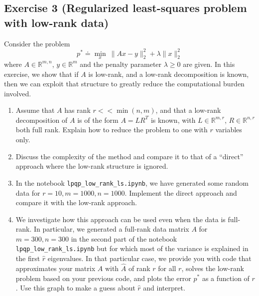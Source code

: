 \documentclass[11pt]{article}
\begin{document}
\newpage
\subsection*{Exercise 3 (Regularized least-squares problem with low-rank data)}

Consider the problem
\[
p^* \doteq \min_{x} \: \|Ax - y\|_2^2+ \lambda \|x\|_2^2
\]
where $A \in \mathbb{R}^{m,n}$, $y \in \mathbb{R}^{m}$ and the penalty parameter $\lambda \ge 0$ are given. In this exercise, we show that if $A$ is low-rank, and a low-rank decomposition is known, then we can exploit that structure to greatly reduce the computational burden involved.

\begin{enumerate}
    \item Assume that $A$ has rank $r << \min(n,m)$, and that a low-rank decomposition of $A$ is of the form $A = LR^T$ is known, with $L \in \mathbb{R}^{m,r}$, $R \in \mathbb{R}^{n,r}$ both full rank. Explain how to reduce the problem to one with $r$ variables only.

    \item Discuss the complexity of the method and compare it to that of a ``direct'' approach where the low-rank structure is ignored.

    \item In the notebook \verb+lpqp_low_rank_ls.ipynb+, we have generated some random data for $r=10, m=1000, n=1000$. Implement the direct approach and compare it with the low-rank approach.

    \item We investigate how this approach can be used even when the data is full-rank. In particular, we generated a full-rank data matrix $A$ for $m=300, n=300$ in the second part of the notebook \verb+lpqp_low_rank_ls.ipynb+ but for which most of the variance is explained in the first $\hat{r}$ eigenvalues. In that particular case, we provide you with code that approximates your matrix $A$ with $\hat{A}$ of rank $r$ for all $r$, solves the low-rank problem based on your previous code, and plots the error $p^*$ as a function of $r$. Use this graph to make a guess about $\hat{r}$ and interpret.
\end{enumerate}
\end{document}

